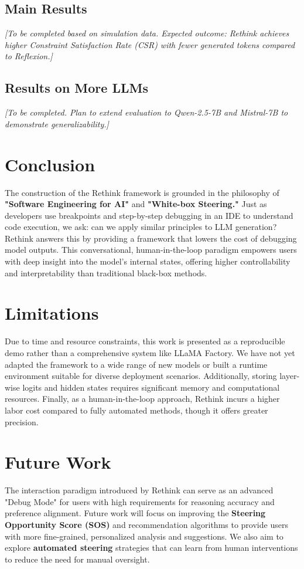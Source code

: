 \documentclass{article}
\begin{document}
\subsection{Main Results}
\textit{[To be completed based on simulation data. Expected outcome: Rethink achieves higher Constraint Satisfaction Rate (CSR) with fewer generated tokens compared to Reflexion.]}

\subsection{Results on More LLMs}
\textit{[To be completed. Plan to extend evaluation to Qwen-2.5-7B and Mistral-7B to demonstrate generalizability.]}

\section{Conclusion}
The construction of the Rethink framework is grounded in the philosophy of \textbf{"Software Engineering for AI"} and \textbf{"White-box Steering."} Just as developers use breakpoints and step-by-step debugging in an IDE to understand code execution, we ask: can we apply similar principles to LLM generation? Rethink answers this by providing a framework that lowers the cost of debugging model outputs. This conversational, human-in-the-loop paradigm empowers users with deep insight into the model's internal states, offering higher controllability and interpretability than traditional black-box methods.

\section{Limitations}
Due to time and resource constraints, this work is presented as a reproducible demo rather than a comprehensive system like LLaMA Factory. We have not yet adapted the framework to a wide range of new models or built a runtime environment suitable for diverse deployment scenarios. Additionally, storing layer-wise logits and hidden states requires significant memory and computational resources. Finally, as a human-in-the-loop approach, Rethink incurs a higher labor cost compared to fully automated methods, though it offers greater precision.

\section{Future Work}
The interaction paradigm introduced by Rethink can serve as an advanced "Debug Mode" for users with high requirements for reasoning accuracy and preference alignment. Future work will focus on improving the \textbf{Steering Opportunity Score (SOS)} and recommendation algorithms to provide users with more fine-grained, personalized analysis and suggestions. We also aim to explore \textbf{automated steering} strategies that can learn from human interventions to reduce the need for manual oversight.
\end{document}
